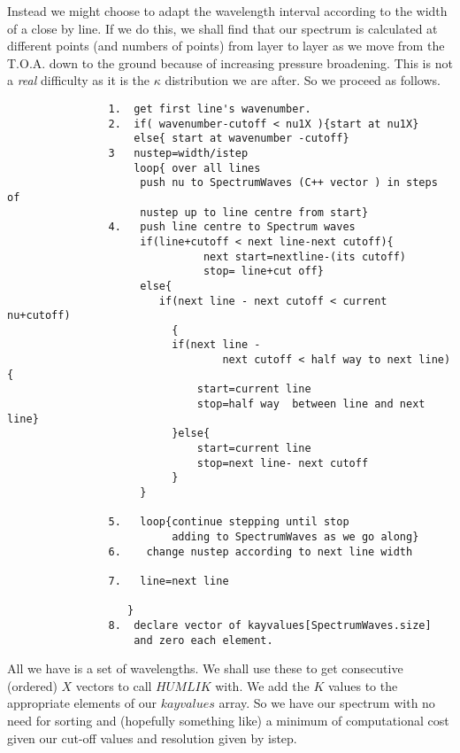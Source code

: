 \documentclass[12pt]{article}
\begin{document}
 Instead we might choose to adapt the wavelength interval according to
the width of a close by line. If we do this, we shall find that our spectrum is calculated at different
points (and numbers of points) from layer to layer as we move from the T.O.A. down to the ground 
because of increasing pressure broadening. This is not a {\it real} difficulty as it is the $\kappa$
distribution we are after. So we proceed as follows.
\begin{verbatim}
                1.  get first line's wavenumber.
                2.  if( wavenumber-cutoff < nu1X ){start at nu1X}
                    else{ start at wavenumber -cutoff}
                3   nustep=width/istep
                    loop{ over all lines     
                     push nu to SpectrumWaves (C++ vector ) in steps of
                     nustep up to line centre from start}
                4.   push line centre to Spectrum waves
                     if(line+cutoff < next line-next cutoff){
                               next start=nextline-(its cutoff) 
                               stop= line+cut off}
                     else{
                        if(next line - next cutoff < current nu+cutoff)
                          {
                          if(next line - 
                                  next cutoff < half way to next line){
                              start=current line
                              stop=half way  between line and next line}
                          }else{
                              start=current line
                              stop=next line- next cutoff
                          }
                     } 

                5.   loop{continue stepping until stop
                          adding to SpectrumWaves as we go along}
                6.    change nustep according to next line width
   
                7.   line=next line
 
                   }
                8.  declare vector of kayvalues[SpectrumWaves.size] 
                    and zero each element.
\end{verbatim} 
All we have is a set of wavelengths. We shall use these to get consecutive (ordered) $X$ vectors to call
$HUMLIK$ with. We add the $K$ values to the appropriate elements of our $kayvalues$ array.
So we have our spectrum with no need for sorting and (hopefully something like) a minimum of computational
cost given our cut-off values and resolution given by istep. 
\end{document}
